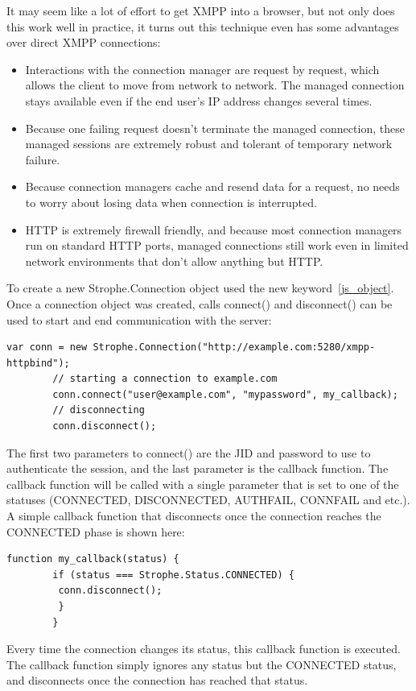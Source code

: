 	It may seem like a lot of effort to get XMPP into a browser, but not only does this work well in practice, it turns out this technique even has some advantages over direct XMPP connections:
	\begin{itemize}
	\item Interactions with the connection manager are request by request, which allows the client to move from network to network. The managed connection stays available even if the end user's IP address changes several times.
	\item Because one failing request doesn't terminate the managed connection, these managed sessions are extremely robust and tolerant of temporary network failure.
	\item Because connection managers cache and resend data for a request, no needs to worry about losing data when connection is interrupted.
	\item HTTP is extremely firewall friendly, and because most connection managers run on standard HTTP ports, managed connections still work even in limited network environments that don’t allow anything but HTTP.
	\end{itemize}

	To create a new Strophe.Connection object used the new keyword~\ref{js_object}.	Once a connection object was created, calls connect() and disconnect() can be used to start and end	communication with the server:
	    \begin{lstlisting}[label=js_object,caption=Stanzas Format]
		var conn = new Strophe.Connection("http://example.com:5280/xmpp-httpbind");
		// starting a connection to example.com
		conn.connect("user@example.com", "mypassword", my_callback);
		// disconnecting
		conn.disconnect();
	    \end{lstlisting}
	The first two parameters to connect() are the JID and password to use to authenticate the session, and the last parameter is the callback function. The callback function will be called with a single parameter that is set to one of the statuses (CONNECTED, DISCONNECTED, AUTHFAIL, CONNFAIL and etc.). A simple callback function that disconnects once the connection reaches the CONNECTED phase is shown here: 
	\begin{lstlisting}[label=js_object,caption=Stanzas Format]
		function my_callback(status) {
		if (status === Strophe.Status.CONNECTED) {
		 conn.disconnect();
		 }
	    }
	\end{lstlisting}
Every time the connection changes its status, this callback function is executed. The callback function simply ignores any status but the CONNECTED status, and disconnects once the connection has reached that status.

